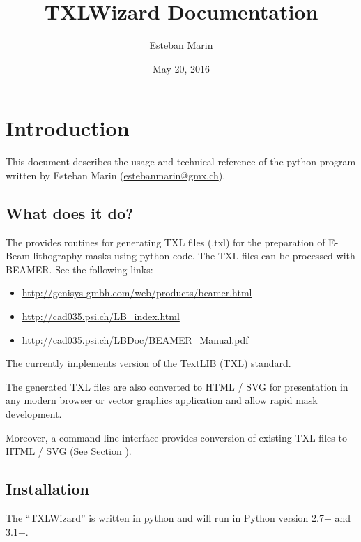\documentclass[letterpaper,10pt,english]{sphinxmanual}
\title{TXLWizard Documentation}
\date{May 20, 2016}
\author{Esteban Marin}
\begin{document}
\maketitle
\tableofcontents
{}\label{index::doc}



\chapter{Introduction}
\label{Chapters/10_Introduction:introduction}\label{Chapters/10_Introduction::doc}\label{Chapters/10_Introduction:welcome-to-txlwizard-s-documentation}
This document describes the usage and technical reference of the python program 
written by Esteban Marin (\href{mailto:estebanmarin@gmx.ch}{estebanmarin@gmx.ch}).


\section{What does it do?}
\label{Chapters/10_Introduction:what-does-it-do}
The  provides routines for generating TXL files (.txl) for
the preparation of E-Beam lithography masks using python code. The TXL files can be processed with BEAMER.
See the following links:
\begin{itemize}
\item {} 
\url{http://genisys-gmbh.com/web/products/beamer.html}

\item {} 
\url{http://cad035.psi.ch/LB\_index.html}

\item {} 
\url{http://cad035.psi.ch/LBDoc/BEAMER\_Manual.pdf}

\end{itemize}

The  currently implements version  of the TextLIB (TXL) standard.

The generated TXL files are also converted to HTML / SVG for presentation in any modern browser or
vector graphics application and allow rapid mask development.

Moreover, a command line interface  provides conversion of existing TXL files to HTML / SVG
(See Section {\hyperref[Chapters/30_TXLConverter:sec\string-txlconverter]{}}).


\section{Installation}
\label{Chapters/10_Introduction:installation}
The ``TXLWizard'' is written in python and will run in Python version 2.7+ and 3.1+.
\end{document}
